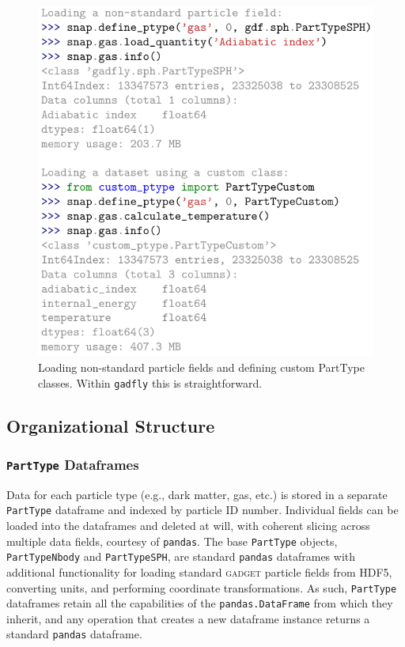 \documentclass{thesis}
\newcommand{\code}[1]{\texttt{#1}}
\begin{document}
\begin{figure}
\begin{center}
\includegraphics[width=\columnwidth]{figures/code_custom_ptypes/code_custom_ptypes}
\caption{\label{fig:custom_ptype}
Loading non-standard particle fields and defining custom PartType classes. Within \code{gadfly} this is straightforward.%
}
\end{center}
\end{figure}

\subsection{Organizational Structure}
\label{sec:hierarchy}

\subsubsection{\code{PartType} Dataframes}
\label{sec:df}
Data for each particle type (e.g., dark matter, gas, etc.) is stored in a separate \code{PartType} dataframe and indexed by particle ID number. 
Individual fields can be loaded into the dataframes and deleted at will, with coherent slicing across multiple data fields, courtesy of \code{pandas}.  
The base \code{PartType} objects, \code{PartTypeNbody} and \code{PartTypeSPH}, are standard \code{pandas} dataframes with additional functionality for loading standard \textsc{gadget} particle fields from HDF5, converting units, and performing coordinate transformations.  
As such, \code{PartType} dataframes retain all the capabilities of the \code{pandas.DataFrame} from which they inherit, and any operation that creates a new dataframe instance returns a standard \code{pandas} dataframe.  
\end{document}
